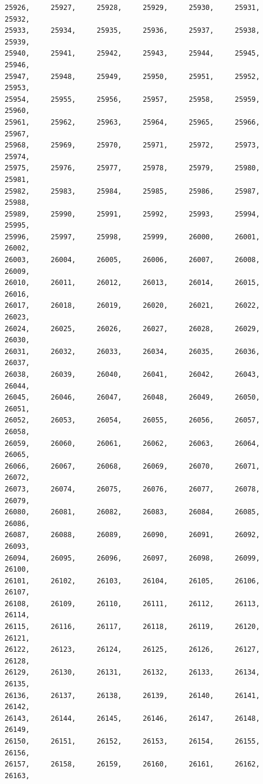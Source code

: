 \documentclass[a4paper,11pt]{report}
\begin{document}
\begin{verbatim}
25926,     25927,     25928,     25929,     25930,     25931,     25932,     
25933,     25934,     25935,     25936,     25937,     25938,     25939,     
25940,     25941,     25942,     25943,     25944,     25945,     25946,     
25947,     25948,     25949,     25950,     25951,     25952,     25953,     
25954,     25955,     25956,     25957,     25958,     25959,     25960,     
25961,     25962,     25963,     25964,     25965,     25966,     25967,     
25968,     25969,     25970,     25971,     25972,     25973,     25974,     
25975,     25976,     25977,     25978,     25979,     25980,     25981,     
25982,     25983,     25984,     25985,     25986,     25987,     25988,     
25989,     25990,     25991,     25992,     25993,     25994,     25995,     
25996,     25997,     25998,     25999,     26000,     26001,     26002,     
26003,     26004,     26005,     26006,     26007,     26008,     26009,     
26010,     26011,     26012,     26013,     26014,     26015,     26016,     
26017,     26018,     26019,     26020,     26021,     26022,     26023,     
26024,     26025,     26026,     26027,     26028,     26029,     26030,     
26031,     26032,     26033,     26034,     26035,     26036,     26037,     
26038,     26039,     26040,     26041,     26042,     26043,     26044,     
26045,     26046,     26047,     26048,     26049,     26050,     26051,     
26052,     26053,     26054,     26055,     26056,     26057,     26058,     
26059,     26060,     26061,     26062,     26063,     26064,     26065,     
26066,     26067,     26068,     26069,     26070,     26071,     26072,     
26073,     26074,     26075,     26076,     26077,     26078,     26079,     
26080,     26081,     26082,     26083,     26084,     26085,     26086,     
26087,     26088,     26089,     26090,     26091,     26092,     26093,     
26094,     26095,     26096,     26097,     26098,     26099,     26100,     
26101,     26102,     26103,     26104,     26105,     26106,     26107,     
26108,     26109,     26110,     26111,     26112,     26113,     26114,     
26115,     26116,     26117,     26118,     26119,     26120,     26121,     
26122,     26123,     26124,     26125,     26126,     26127,     26128,     
26129,     26130,     26131,     26132,     26133,     26134,     26135,     
26136,     26137,     26138,     26139,     26140,     26141,     26142,     
26143,     26144,     26145,     26146,     26147,     26148,     26149,     
26150,     26151,     26152,     26153,     26154,     26155,     26156,     
26157,     26158,     26159,     26160,     26161,     26162,     26163,     

\end{verbatim}
\end{document}
